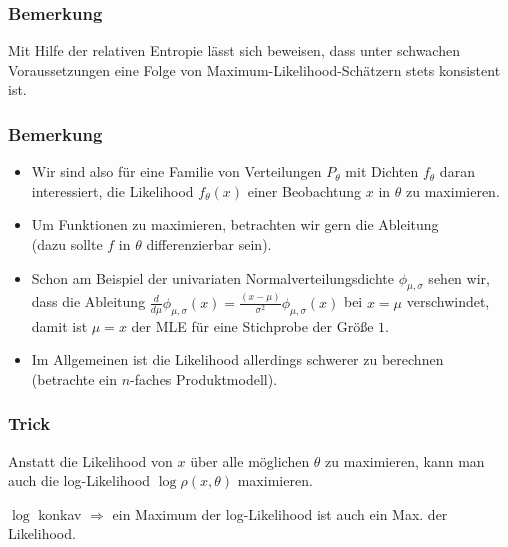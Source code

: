   
      \begin{frame}
    \frametitle{Bemerkung} 
    Mit Hilfe der relativen Entropie lässt sich beweisen, dass unter schwachen Voraussetzungen eine Folge von Maximum-Likelihood-Schätzern stets konsistent ist.

  \end{frame}

  
      \begin{frame}
        \frametitle{Bemerkung}
        \begin{itemize}[<+->]
          \item
    Wir sind also für eine Familie von Verteilungen $P_\theta$ mit Dichten $f_\theta$ daran interessiert, die Likelihood $f_\theta(x)$ einer Beobachtung $x$ in $\theta$ zu maximieren.
          \item
    Um Funktionen zu maximieren, betrachten wir gern die Ableitung\\ (dazu sollte $f$ in $\theta$ differenzierbar sein).
          \item
            Schon am Beispiel der univariaten Normalverteilungsdichte $\phi_{\mu,\sigma}$ sehen wir, dass die Ableitung $\frac{d}{d\mu} \phi_{\mu,\sigma}(x) =\frac{(x-\mu)}{\sigma^2} \phi_{\mu,\sigma}(x)$ bei $x=\mu$ verschwindet,\\
            damit ist $\mu=x$ der MLE für eine Stichprobe der Größe $1$.
          \item
            Im Allgemeinen ist die Likelihood allerdings schwerer zu berechnen \\
            (betrachte ein $n$-faches Produktmodell).
        \end{itemize}
      \end{frame}

  
      \begin{frame}
    \frametitle{Trick}
    Anstatt die Likelihood von $x$ über alle möglichen $\theta$ zu maximieren, kann man auch die \alert{log-Likelihood} $\log \rho(x,\theta)$ maximieren.

    $\log$ konkav $\Rightarrow$ ein Maximum der log-Likelihood ist auch ein Max. der Likelihood.

  \end{frame}

